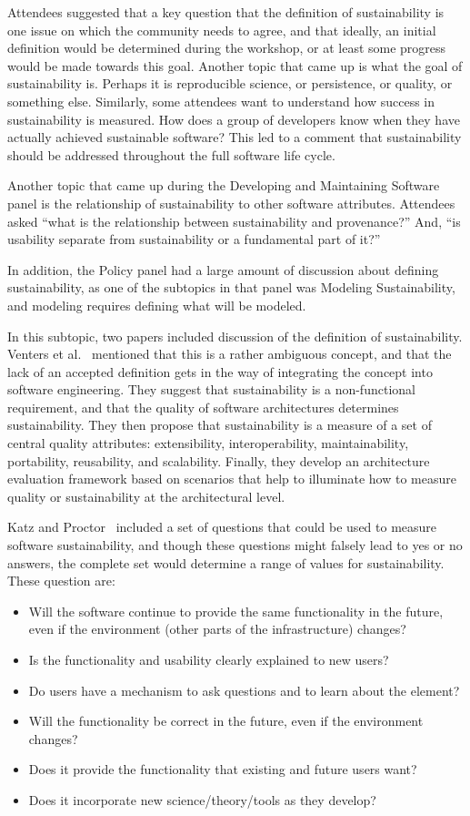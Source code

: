 \documentclass[11pt, oneside]{amsart}
\begin{document}
Attendees suggested that a key question that the definition of sustainability is
one issue on which the community needs to agree, and that ideally, an initial
definition would be determined during the workshop, or at least some progress
would be made towards this goal.  Another topic that came up is what the
goal of sustainability is.  Perhaps it is reproducible science, or
persistence, or quality, or something else.  Similarly, some attendees want
to understand how success in sustainability is measured.  How does a group of
developers know when they have actually achieved sustainable software?
This led to a comment that sustainability should be addressed throughout the
full software life cycle.

Another topic that came up during the Developing and Maintaining Software
panel is the relationship of sustainability to other software attributes.  Attendees
asked ``what is the relationship between sustainability and provenance?'' And,
``is usability separate from sustainability or a fundamental part of it?''

In addition, the Policy panel had a large amount of discussion about
defining sustainability, as one of the subtopics in that panel was
Modeling Sustainability, and modeling requires defining what will be modeled.

In this subtopic, two papers included discussion of the definition of
sustainability.  Venters et al.~\cite{Venters_WSSSPE} mentioned
that this is a rather ambiguous concept, and that the lack of an accepted
definition gets in the way of integrating the concept into software engineering.
They suggest that sustainability is a non-functional requirement, and that the
quality of software architectures determines sustainability.  They then
propose that sustainability is a measure of a set of central quality attributes:
extensibility, interoperability, maintainability, portability, reusability, and scalability.
Finally, they develop an architecture evaluation framework based on scenarios
that help to illuminate how to measure quality or sustainability at
the architectural level.

Katz and Proctor~\cite{Katz_WSSSPE} included a set of questions that could
be used to measure software sustainability, and though these questions might falsely lead
to yes or no answers, the complete set would determine a range of values for
sustainability. These question are:
\begin{itemize}
\item Will the software continue to provide the same functionality in the future, 
      even if the environment (other parts of the infrastructure) changes?
\item Is the functionality and usability clearly explained to new users? 
\item Do users have a mechanism to ask questions and to learn about the element?
\item Will the functionality be correct in the future, even if the environment changes?
\item Does it provide the functionality that existing and future users want?
\item Does it incorporate new science/theory/tools as they develop?
\end{itemize}
\end{document}
